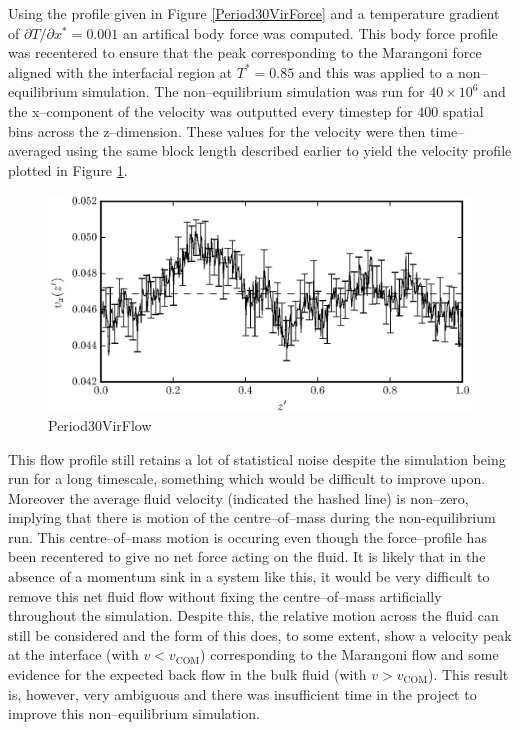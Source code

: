 Using the profile given in Figure \ref{Period30VirForce} and a temperature gradient of $\partial T / \partial x^{*} = 0.001$ an artifical body force was computed.
This body force profile was recentered to ensure that the peak corresponding to the Marangoni force aligned with the interfacial region at $T^{*} = 0.85$ and this was applied to a non--equilibrium simulation.
The non--equilibrium simulation was run for $40 \times 10^{6}$ and the x--component of the velocity was outputted every timestep for $400$ spatial bins across the z--dimension. 
These values for the velocity were then time--averaged using the same block length described earlier to yield the velocity profile plotted in Figure \ref{Period30VirFlow}.

\begin{figure}[h]
\centering
\includegraphics[scale=0.8]{Period30VirFlow}
\caption{Period30VirFlow}
\label{Period30VirFlow}
\end{figure}

This flow profile still retains a lot of statistical noise despite the simulation being run for a long timescale, something which would be difficult to improve upon.
Moreover the average fluid velocity (indicated the hashed line) is non--zero, implying that there is motion of the centre--of--mass during the non-equilibrium run.
This centre--of--mass motion is occuring even though the force--profile has been recentered to give no net force acting on the fluid. 
It is likely that in the absence of a momentum sink in a system like this, it would be very difficult to remove this net fluid flow without fixing the centre--of--mass artificially throughout the simulation.
Despite this, the relative motion across the fluid can still be considered and the form of this does, to some extent, show a velocity peak at the interface (with $v < v_{\mathrm{COM}}$) corresponding to the Marangoni flow and some evidence for the expected back flow in the bulk fluid (with $v > v_{\mathrm{COM}}$).
This result is, however, very ambiguous and there was insufficient time in the project to improve this non--equilibrium simulation.

